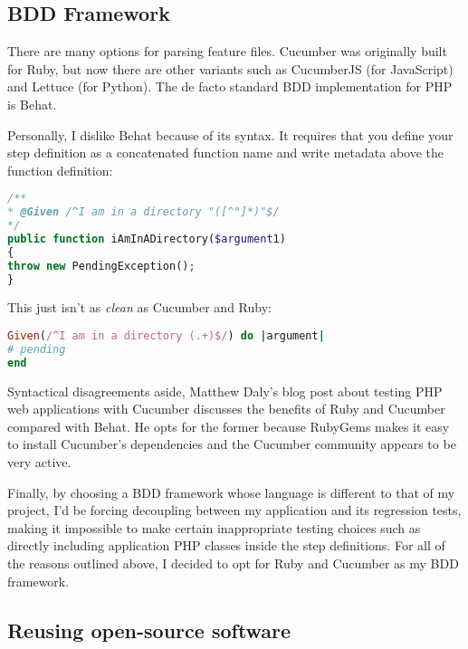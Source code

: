 \subsection{BDD Framework}

There are many options for parsing feature files. Cucumber was originally built for Ruby, but now there are other variants such as CucumberJS (for JavaScript) and Lettuce (for Python). The de facto standard BDD implementation for PHP is Behat.

Personally, I dislike Behat because of its syntax. It requires that you define your step definition as a concatenated function name and write metadata above the function definition:

\begin{minipage}{\textwidth}
\begin{lstlisting}[language=php]
/**
* @Given /^I am in a directory "([^"]*)"$/
*/
public function iAmInADirectory($argument1)
{
throw new PendingException();
}
\end{lstlisting}
\end{minipage}

This just isn't as \emph{clean} as Cucumber and Ruby:

\begin{minipage}{\textwidth}
\begin{lstlisting}[language=ruby]
Given(/^I am in a directory (.+)$/) do |argument|
# pending
end
\end{lstlisting}
\end{minipage}

Syntactical disagreements aside, Matthew Daly's blog post about testing PHP web applications with Cucumber discusses the benefits of Ruby and Cucumber compared with Behat. He opts for the former because RubyGems makes it easy to install Cucumber's dependencies and the Cucumber community appears to be very active.~\cite{matthewDaly}

Finally, by choosing a BDD framework whose language is different to that of my project, I'd be forcing decoupling between my application and its regression tests, making it impossible to make certain inappropriate testing choices such as directly including application PHP classes inside the step definitions. For all of the reasons outlined above, I decided to opt for Ruby and Cucumber as my BDD framework.

\subsection{Reusing open-source software}

